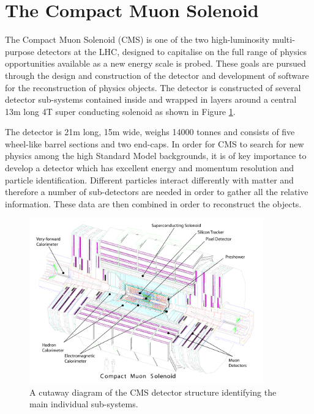 \section{The Compact Muon Solenoid}

The Compact Muon Solenoid (CMS) is one of the two high-luminosity multi-purpose detectors at the LHC, designed to capitalise on the full range of physics opportunities available as a new energy scale is probed. These goals are pursued through the design and construction of the detector and development of software for the reconstruction of physics objects. The detector is constructed of several detector sub-systems contained inside and wrapped in layers around a central 13m long 4T super conducting solenoid as shown in Figure \ref{fig:CMS_Struct}. 

The detector is 21m long, 15m wide, weighs 14000 tonnes and consists of five wheel-like barrel sections and two end-caps. In order for CMS to search for new physics among the high Standard Model backgrounds, it is of key importance to develop a detector which has excellent energy and momentum resolution and particle identification. Different particles interact differently with matter and therefore a number of sub-detectors are needed in order to gather all the relative information. These data are then combined in order to reconstruct the objects. 

\begin{figure}[htbp]
\centering
\includegraphics[width=0.9\textwidth]{Figures/Detector/CMS_Structure}
\caption{A cutaway diagram of the CMS detector structure identifying the main individual sub-systems.}
\label{fig:CMS_Struct}
\end{figure}

